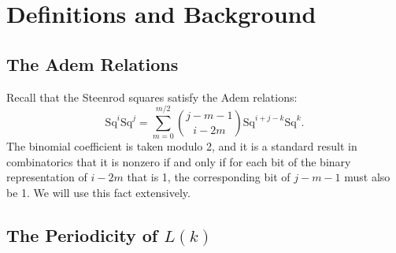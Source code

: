 \documentclass{article}
\newcommand{\Sq}{\mathrm{Sq}}
\begin{document}
\section{Definitions and Background}\label{sec:defns}

\subsection{The Adem Relations}

Recall that the Steenrod squares satisfy the Adem relations:
\[ \Sq^i\Sq^j = \sum_{m=0}^{m/2}\binom{j-m-1}{i-2m}\Sq^{i+j-k}\Sq^k.\]
The binomial coefficient is taken modulo 2, and it is a standard result in combinatorics that it is nonzero if and only if for each bit of the binary representation of $i-2m$ that is 1, the corresponding bit of $j-m-1$ must also be 1.  We will use this fact extensively.

\subsection{The Periodicity of \boldmath$L(k)$}
\end{document}
